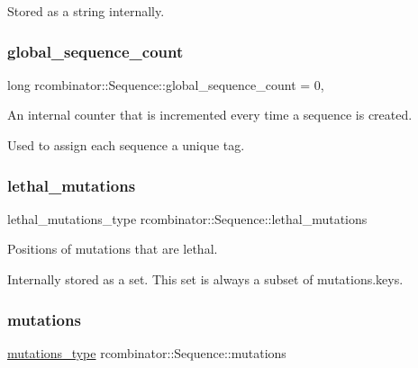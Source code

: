 Stored as a string internally. \mbox{\label{classrcombinator_1_1Sequence_abb45023862671bbc450bdea543e72165}} 
\subsubsection{\texorpdfstring{global\+\_\+sequence\+\_\+count}{global\_sequence\_count}}
{\footnotesize\ttfamily long rcombinator\+::\+Sequence\+::global\+\_\+sequence\+\_\+count = 0\hspace{0.3cm}{\ttfamily [static]}, {\ttfamily [private]}}



An internal counter that is incremented every time a sequence is created. 

Used to assign each sequence a unique tag. \mbox{\label{classrcombinator_1_1Sequence_abbef2567c1f68239c80769db85455b00}} 
\subsubsection{\texorpdfstring{lethal\+\_\+mutations}{lethal\_mutations}}
{\footnotesize\ttfamily lethal\+\_\+mutations\+\_\+type rcombinator\+::\+Sequence\+::lethal\+\_\+mutations\hspace{0.3cm}{\ttfamily [private]}}



Positions of mutations that are lethal. 

Internally stored as a set. This set is always a subset of {\ttfamily mutations.\+keys}. \mbox{\label{classrcombinator_1_1Sequence_a8aac49ef635b95fe0088e5fb59e2bce7}} 
\subsubsection{\texorpdfstring{mutations}{mutations}}
{\footnotesize\ttfamily \mbox{\hyperlink{classrcombinator_1_1Sequence_a95c6d1eea79f9551118a4c988433e5b7}{mutations\+\_\+type}} rcombinator\+::\+Sequence\+::mutations\hspace{0.3cm}{\ttfamily [private]}}



